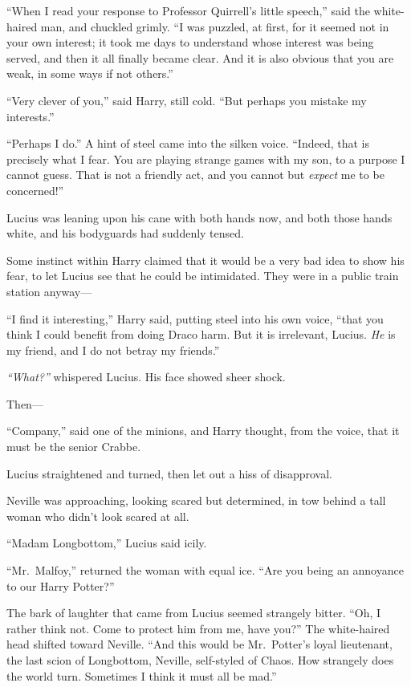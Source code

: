 ``When I read your response to Professor Quirrell's little speech,''
said the white-haired man, and chuckled grimly. ``I was puzzled, at
first, for it seemed not in your own interest; it took me days to
understand whose interest was being served, and then it all finally
became clear. And it is also obvious that you are weak, in some ways if
not others.''

``Very clever of you,'' said Harry, still cold. ``But perhaps you
mistake my interests.''

``Perhaps I do.'' A hint of steel came into the silken voice. ``Indeed,
that is precisely what I fear. You are playing strange games with my
son, to a purpose I cannot guess. That is not a friendly act, and you
cannot but \emph{expect} me to be concerned!''

Lucius was leaning upon his cane with both hands now, and both those
hands white, and his bodyguards had suddenly tensed.

Some instinct within Harry claimed that it would be a very bad idea to
show his fear, to let Lucius see that he could be intimidated. They were
in a public train station anyway---

``I find it interesting,'' Harry said, putting steel into his own voice,
``that you think I could benefit from doing Draco harm. But it is
irrelevant, Lucius. \emph{He} is my friend, and I do not betray my
friends.''

\emph{``What?''} whispered Lucius. His face showed sheer shock.

Then---

``Company,'' said one of the minions, and Harry thought, from the voice,
that it must be the senior Crabbe.

Lucius straightened and turned, then let out a hiss of disapproval.

Neville was approaching, looking scared but determined, in tow behind a
tall woman who didn't look scared at all.

``Madam Longbottom,'' Lucius said icily.

``Mr.~Malfoy,'' returned the woman with equal ice. ``Are you being an
annoyance to our Harry Potter?''

The bark of laughter that came from Lucius seemed strangely bitter.
``Oh, I rather think not. Come to protect him from me, have you?'' The
white-haired head shifted toward Neville. ``And this would be
Mr.~Potter's loyal lieutenant, the last scion of Longbottom, Neville,
self-styled of Chaos. How strangely does the world turn. Sometimes I
think it must all be mad.''


